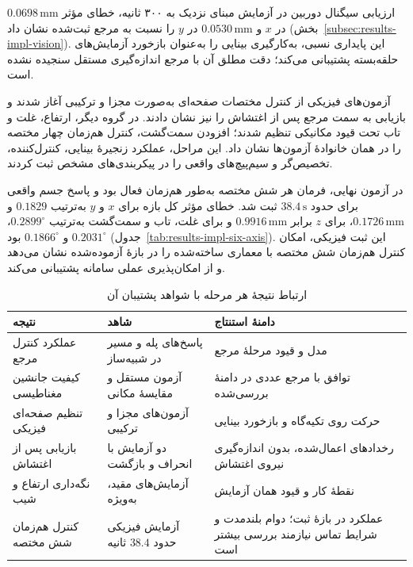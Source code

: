 ارزیابی سیگنال دوربین در آزمایش مبنای نزدیک به ۳۰۰ ثانیه، خطای مؤثر $0.0698\,\mathrm{mm}$ در $x$ و $0.0530\,\mathrm{mm}$ در $y$ را نسبت به مرجع ثبت‌شده نشان داد (بخش~\ref{subsec:results-impl-vision}). این پایداری نسبی، به‌کارگیری بینایی را به‌عنوان بازخورد آزمایش‌های حلقه‌بسته پشتیبانی می‌کند؛ دقت مطلق آن با مرجع اندازه‌گیری مستقل سنجیده نشده است.

آزمون‌های فیزیکی از کنترل مختصات صفحه‌ای به‌صورت مجزا و ترکیبی آغاز شدند و بازیابی به سمت مرجع پس از اغتشاش را نیز نشان دادند. در گروه دیگر، ارتفاع، غلت و تاب تحت قیود مکانیکی تنظیم شدند؛ افزودن سمت‌گشت، کنترل هم‌زمان چهار مختصه را در همان خانوادهٔ آزمون‌ها نشان داد. این مراحل، عملکرد زنجیرهٔ بینایی، کنترل‌کننده، تخصیص‌گر و سیم‌پیچ‌های واقعی را در پیکربندی‌های مشخص ثبت کردند.

در آزمون نهایی، فرمان هر شش مختصه به‌طور هم‌زمان فعال بود و پاسخ جسم واقعی برای حدود $38.4\,\mathrm s$ ثبت شد. خطای مؤثر کل بازه برای $x$ و $y$ به‌ترتیب $0.1829$ و $0.1726\,\mathrm{mm}$، برای $z$ برابر $0.9916\,\mathrm{mm}$ و برای غلت، تاب و سمت‌گشت به‌ترتیب $0.2899^\circ$، $0.2031^\circ$ و $0.1866^\circ$ بود (جدول~\ref{tab:results-impl-six-axis}). این ثبت فیزیکی، امکان کنترل هم‌زمان شش مختصه با معماری ساخته‌شده را در بازهٔ آزموده‌شده نشان می‌دهد و از امکان‌پذیری عملی سامانه پشتیبانی می‌کند.

\begin{table}[htbp]
	\centering
	\caption{ارتباط نتیجهٔ هر مرحله با شواهد پشتیبان آن}
	\label{tab:results-impl-evidence}
	\small
	\begin{tabular}{p{} p{} p{}}
		\toprule
		نتیجه & شاهد & دامنهٔ استنتاج \\
		\midrule
		عملکرد کنترل مرجع & پاسخ‌های پله و مسیر در شبیه‌ساز & مدل و قیود مرحلهٔ مرجع \\
		کیفیت جانشین مغناطیسی & آزمون مستقل و مقایسهٔ مکانی & توافق با مرجع عددی در دامنهٔ بررسی‌شده \\
		تنظیم صفحه‌ای فیزیکی & آزمون‌های مجزا و ترکیبی & حرکت روی تکیه‌گاه و بازخورد بینایی \\
		بازیابی پس از اغتشاش & دو آزمایش با انحراف و بازگشت & رخدادهای اعمال‌شده، بدون اندازه‌گیری نیروی اغتشاش \\
		نگه‌داری ارتفاع و شیب & آزمایش‌های مقید، به‌ویژه \lr{ZRP-5} & نقطهٔ کار و قیود همان آزمایش \\
		کنترل هم‌زمان شش مختصه & آزمایش فیزیکی حدود $38.4$ ثانیه & عملکرد در بازهٔ ثبت؛ دوام بلندمدت و شرایط تماس نیازمند بررسی بیشتر است \\
		\bottomrule
	\end{tabular}
\end{table}

